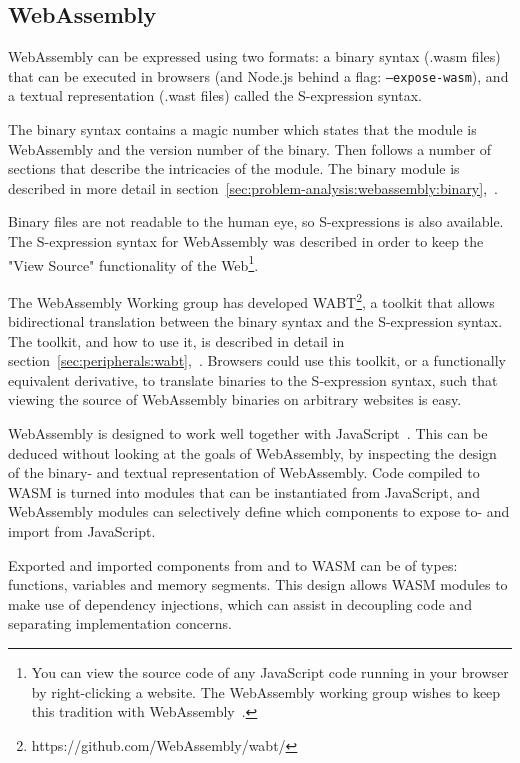 \documentclass[a4paper]{article}
\begin{document}
\subsection{WebAssembly}
\label{sec:problem-analysis:webassembly}
WebAssembly can be expressed using two formats: a binary syntax (.wasm files) that can be executed in browsers (and Node.js behind a flag: \texttt{--expose-wasm}), and a textual representation (.wast files) called the S-expression syntax.

The binary syntax contains a magic number which states that the module is WebAssembly and the version number of the binary. Then follows a number of sections that describe the intricacies of the module. The binary module is described in more detail in section~\ref{sec:problem-analysis:webassembly:binary},~.

Binary files are not readable to the human eye, so S-expressions is also available. The S-expression syntax for WebAssembly was described in order to keep the "View Source" functionality of the Web\footnote{You can view the source code of any JavaScript code running in your browser by right-clicking a website. The WebAssembly working group wishes to keep this tradition with WebAssembly~\cite{website:wasm-webassembly-high-level-goals}.}.

The WebAssembly Working group has developed WABT\footnote{https://github.com/WebAssembly/wabt/}, a toolkit that allows bidirectional translation between the binary syntax and the S-expression syntax. The toolkit, and how to use it, is described in detail in section~\ref{sec:peripherals:wabt},~. Browsers could use this toolkit, or a functionally equivalent derivative, to translate binaries to the S-expression syntax, such that viewing the source of WebAssembly binaries on arbitrary websites is easy.

WebAssembly is designed to work well together with JavaScript~\cite{website:wasm-webassembly-high-level-goals}. This can be deduced without looking at the goals of WebAssembly, by inspecting the design of the binary- and textual representation of WebAssembly. Code compiled to WASM is turned into modules that can be instantiated from JavaScript, and WebAssembly modules can selectively define which components to expose to- and import from JavaScript.

Exported and imported components from and to WASM can be of types: functions, variables and memory segments. This design allows WASM modules to make use of dependency injections, which can assist in decoupling code and separating implementation concerns.
\end{document}
